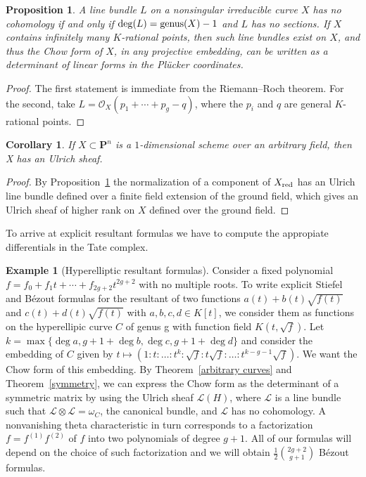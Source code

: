 \documentclass{jams-l}
\newtheorem{proposition}[theorem]{Proposition}
\newtheorem{corollary}[theorem]{Corollary}
\theoremstyle{definition}
\newtheorem{example}[theorem]{Example}
\theoremstyle{remark}
\newcommand{\Lcal}{{\mathcal L}}
\newcommand{\Ocal}{{\mathcal O}}
\newcommand{\PP}{{\mathbf P}}
\begin{document}
\begin{proposition}\label{ineff} A line bundle $L$ on a
nonsingular irreducible curve $X$ has no cohomology
 if and only if $\deg(L)={\rm genus}(X)-1$ and
$L$ has no sections. If $X$ contains infinitely many $K$-rational
points,
then such line bundles exist on $X$, and thus the Chow form
of $X$, in any projective embedding, can be written as a
determinant of linear forms in the Pl\"ucker coordinates.
\end{proposition}

\begin{proof} The first statement is immediate from the Riemann--Roch theorem.
For the second, take $L=\Ocal_X(p_1+\cdots+p_g-q)$, where the
$p_i$ and $q$ are general $K$-rational points.
\end{proof}

\begin{corollary}\label{ulrich on curves} If $X \subset \PP^n$ is a
$1$-dimensional scheme over an arbitrary field, then
X has an Ulrich sheaf.
\end{corollary}

\begin{proof} By Proposition~\ref{ineff} the normalization of a
component of $X_{\rm red}$ has an Ulrich line bundle defined  
over a finite field extension of the 
ground field, which gives an Ulrich sheaf of 
higher rank on $X$ defined over the ground field.
\end{proof}

To arrive at explicit resultant formulas 
we have to compute the appropiate  differentials in the Tate complex.

\begin{example}[Hyperelliptic resultant formulas] 
\label{hyperelliptic resultant}
Consider a fixed polynomial $f=f_0+f_1t+\cdots+f_{2g+2}t^{2g+2}$ with no 
multiple roots.
To write explicit Stiefel and B\'ezout formulas for
the resultant of
two functions
$a(t)+b(t)\sqrt{f(t)}$ and $c(t)+d(t)\sqrt{f(t)}$ with $a,b,c,d  \in K[t]$,
we consider them as functions on the hyperellipic curve $C$ of genus g 
with function
field $K(t,\sqrt f )$.  Let  $k= \max\{\deg a, g+1+\deg b, \deg c,
g+1+\deg d \}$ and consider the embedding of $C$ given by
$t \mapsto (1:t:\ldots:t^k:\sqrt f:t\sqrt f:\ldots: t^{k-g-1}\sqrt f)$.
We want the Chow form of this embedding. By Theorem~\ref{arbitrary curves}
and Theorem~\ref{symmetry}, we can express the Chow form
 as the determinant of a symmetric matrix
by using the Ulrich sheaf $\Lcal(H)$, where $\Lcal$ is 
a line bundle such that $\Lcal\otimes \Lcal=\omega_C$, the
canonical bundle, and $\Lcal$ has no cohomology. 
A nonvanishing theta characteristic in turn corresponds to a 
factorization $f=f^{(1)}f^{(2)}$ of $f$ into two 
polynomials of degree $g+1$. All of our formulas will depend on the
choice of such factorization and we will obtain
 ${\frac12}{2g+2\choose g+1}$  B\'ezout formulas.
\end{example}
\end{document}
